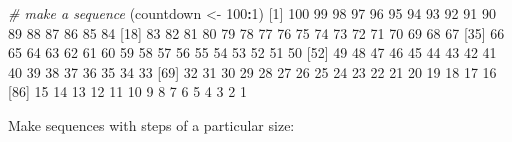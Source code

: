 \documentclass[]{article}
\newenvironment{Shaded}{\begin{snugshade}}{\end{snugshade}}
\newcommand{\CommentTok}[1]{\textcolor[rgb]{0.56,0.35,0.01}{\textit{#1}}}
\newcommand{\DecValTok}[1]{\textcolor[rgb]{0.00,0.00,0.81}{#1}}
\newcommand{\NormalTok}[1]{#1}
\newcommand{\OperatorTok}[1]{\textcolor[rgb]{0.81,0.36,0.00}{\textbf{#1}}}
\newcommand{\StringTok}[1]{\textcolor[rgb]{0.31,0.60,0.02}{#1}}
\begin{document}
\begin{Shaded}
\begin{Highlighting}[]
\CommentTok{# make a sequence}
\NormalTok{(countdown <-}\StringTok{ }\DecValTok{100}\OperatorTok{:}\DecValTok{1}\NormalTok{)}
\NormalTok{  [}\DecValTok{1}\NormalTok{] }\DecValTok{100}  \DecValTok{99}  \DecValTok{98}  \DecValTok{97}  \DecValTok{96}  \DecValTok{95}  \DecValTok{94}  \DecValTok{93}  \DecValTok{92}  \DecValTok{91}  \DecValTok{90}  \DecValTok{89}  \DecValTok{88}  \DecValTok{87}  \DecValTok{86}  \DecValTok{85}  \DecValTok{84}
\NormalTok{ [}\DecValTok{18}\NormalTok{]  }\DecValTok{83}  \DecValTok{82}  \DecValTok{81}  \DecValTok{80}  \DecValTok{79}  \DecValTok{78}  \DecValTok{77}  \DecValTok{76}  \DecValTok{75}  \DecValTok{74}  \DecValTok{73}  \DecValTok{72}  \DecValTok{71}  \DecValTok{70}  \DecValTok{69}  \DecValTok{68}  \DecValTok{67}
\NormalTok{ [}\DecValTok{35}\NormalTok{]  }\DecValTok{66}  \DecValTok{65}  \DecValTok{64}  \DecValTok{63}  \DecValTok{62}  \DecValTok{61}  \DecValTok{60}  \DecValTok{59}  \DecValTok{58}  \DecValTok{57}  \DecValTok{56}  \DecValTok{55}  \DecValTok{54}  \DecValTok{53}  \DecValTok{52}  \DecValTok{51}  \DecValTok{50}
\NormalTok{ [}\DecValTok{52}\NormalTok{]  }\DecValTok{49}  \DecValTok{48}  \DecValTok{47}  \DecValTok{46}  \DecValTok{45}  \DecValTok{44}  \DecValTok{43}  \DecValTok{42}  \DecValTok{41}  \DecValTok{40}  \DecValTok{39}  \DecValTok{38}  \DecValTok{37}  \DecValTok{36}  \DecValTok{35}  \DecValTok{34}  \DecValTok{33}
\NormalTok{ [}\DecValTok{69}\NormalTok{]  }\DecValTok{32}  \DecValTok{31}  \DecValTok{30}  \DecValTok{29}  \DecValTok{28}  \DecValTok{27}  \DecValTok{26}  \DecValTok{25}  \DecValTok{24}  \DecValTok{23}  \DecValTok{22}  \DecValTok{21}  \DecValTok{20}  \DecValTok{19}  \DecValTok{18}  \DecValTok{17}  \DecValTok{16}
\NormalTok{ [}\DecValTok{86}\NormalTok{]  }\DecValTok{15}  \DecValTok{14}  \DecValTok{13}  \DecValTok{12}  \DecValTok{11}  \DecValTok{10}   \DecValTok{9}   \DecValTok{8}   \DecValTok{7}   \DecValTok{6}   \DecValTok{5}   \DecValTok{4}   \DecValTok{3}   \DecValTok{2}   \DecValTok{1}
\end{Highlighting}
\end{Shaded}

Make sequences with steps of a particular size:
\end{document}
